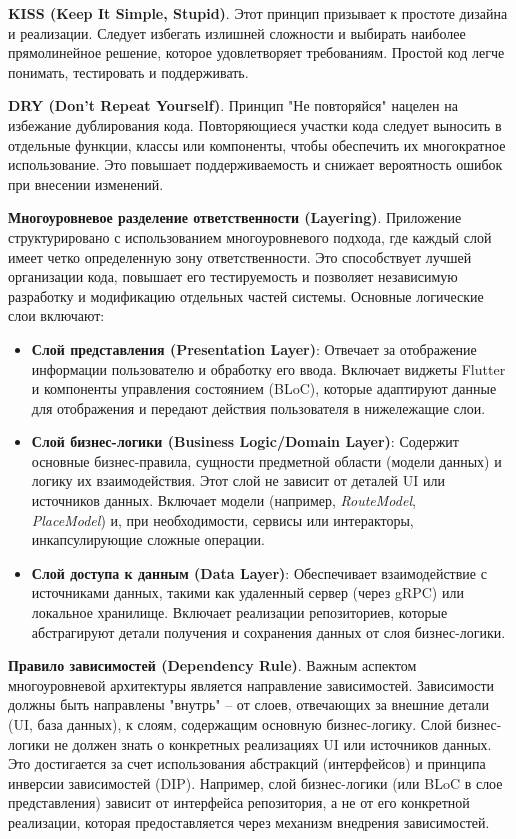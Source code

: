 \textbf{KISS (Keep It Simple, Stupid)}.
Этот принцип призывает к простоте дизайна и реализации. Следует избегать излишней сложности и выбирать наиболее прямолинейное решение, которое удовлетворяет требованиям. Простой код легче понимать, тестировать и поддерживать.

\textbf{DRY (Don't Repeat Yourself)}.
Принцип "Не повторяйся" нацелен на избежание дублирования кода. Повторяющиеся участки кода следует выносить в отдельные функции, классы или компоненты, чтобы обеспечить их многократное использование. Это повышает поддерживаемость и снижает вероятность ошибок при внесении изменений.

\textbf{Многоуровневое разделение ответственности (Layering)}.
Приложение структурировано с использованием многоуровневого подхода, где каждый слой имеет четко определенную зону ответственности. Это способствует лучшей организации кода, повышает его тестируемость и позволяет независимую разработку и модификацию отдельных частей системы. Основные логические слои включают:
\begin{itemize}
    \item \textbf{Слой представления (Presentation Layer)}: Отвечает за отображение информации пользователю и обработку его ввода. Включает виджеты Flutter и компоненты управления состоянием (BLoC), которые адаптируют данные для отображения и передают действия пользователя в нижележащие слои.
    \item \textbf{Слой бизнес-логики (Business Logic/Domain Layer)}: Содержит основные бизнес-правила, сущности предметной области (модели данных) и логику их взаимодействия. Этот слой не зависит от деталей UI или источников данных. Включает модели (например, \textit{RouteModel}, \\ \textit{PlaceModel}) и, при необходимости, сервисы или интеракторы, инкапсулирующие сложные операции.
    \item \textbf{Слой доступа к данным (Data Layer)}: Обеспечивает взаимодействие с источниками данных, такими как удаленный сервер (через gRPC) или локальное хранилище. Включает реализации репозиториев, которые абстрагируют детали получения и сохранения данных от слоя бизнес-логики.
\end{itemize}

\textbf{Правило зависимостей (Dependency Rule)}.
Важным аспектом многоуровневой архитектуры является направление зависимостей. Зависимости должны быть направлены "внутрь" – от слоев, отвечающих за внешние детали (UI, база данных), к слоям, содержащим основную бизнес-логику. Слой бизнес-логики не должен знать о конкретных реализациях UI или источников данных. Это достигается за счет использования абстракций (интерфейсов) и принципа инверсии зависимостей (DIP). Например, слой бизнес-логики (или BLoC в слое представления) зависит от интерфейса репозитория, а не от его конкретной реализации, которая предоставляется через механизм внедрения зависимостей.

